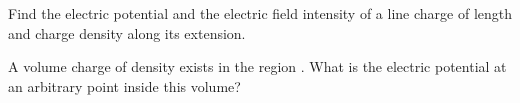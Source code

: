 \begin{ELexample}{}

Find the electric potential and the electric field intensity of a line charge of length  and charge density \ELim{\rho_\ell} along its extension.


\begin{ELsolution}


\end{ELsolution}

\end{ELexample}


\begin{ELexample}{}

A volume charge of density  exists in the region . What is the electric potential at an arbitrary point inside this volume?


\begin{ELsolution}


\end{ELsolution}

\end{ELexample}

\ELhold

